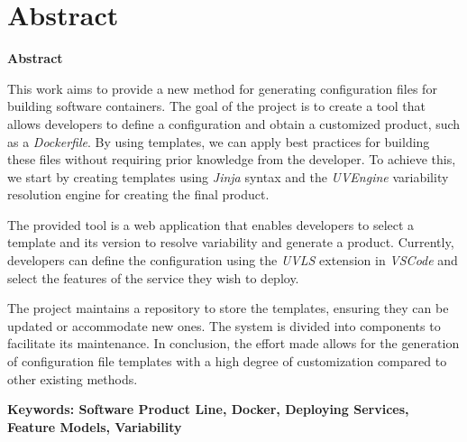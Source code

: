 \documentclass[../main.tex]{subfiles}
\begin{document}
\makeatletter
\renewenvironment{abstract}{%
    \if@twocolumn
      \section*{Abstract \\}%
    \else %
    \begin{flushright}
        {\filleft\Huge\bfseries\fontsize{48pt}{12}\selectfont Abstract\vspace{\z@}}%
        \end{flushright}
      \quotation
    \fi}
    {\if@twocolumn\else\endquotation\fi}
\makeatother
\begin{abstract}

  This work aims to provide a new method for generating configuration files for building software containers. The goal of the project is to create a tool that allows developers to define a configuration and obtain a customized product, such as a \emph{Dockerfile}. By using templates, we can apply best practices for building these files without requiring prior knowledge from the developer. To achieve this, we start by creating templates using \emph{Jinja} syntax and the \emph{UVEngine} variability resolution engine for creating the final product.

  The provided tool is a web application that enables developers to select a template and its version to resolve variability and generate a product. Currently, developers can define the configuration using the \emph{UVLS} extension in \emph{VSCode} and select the features of the service they wish to deploy.
  
  The project maintains a repository to store the templates, ensuring they can be updated or accommodate new ones. The system is divided into components to facilitate its maintenance. In conclusion, the effort made allows for the generation of configuration file templates with a high degree of customization compared to other existing methods.

\bfseries{\large{Keywords:}} Software Product Line, Docker, Deploying Services, Feature Models, Variability

\end{abstract}
\end{document}
